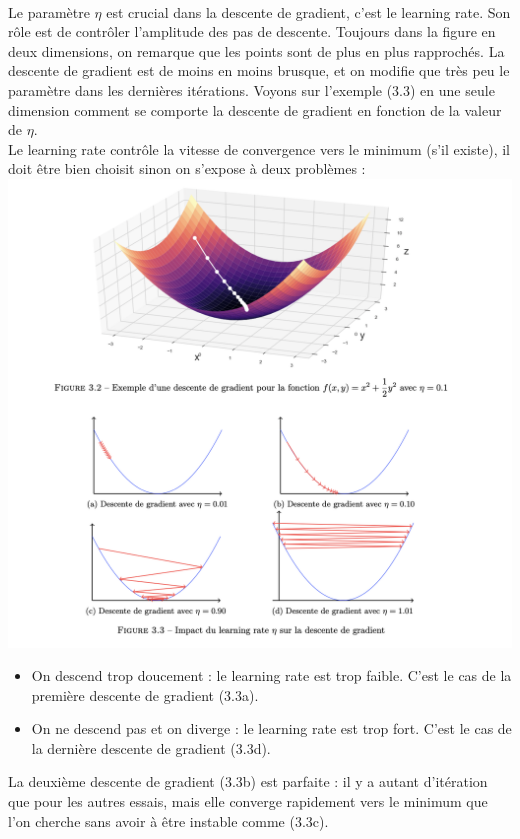 \\
Le paramètre $\eta$ est crucial dans la descente de gradient, c’est le learning rate. Son rôle est de contrôler l’amplitude des pas de descente. Toujours dans la figure en deux dimensions, on remarque que les points sont de plus en plus rapprochés. La descente de gradient est de moins en moins brusque, et on modifie que très peu le paramètre dans les dernières itérations. Voyons sur l’exemple (3.3) en une seule dimension comment se comporte la descente de gradient en fonction de la valeur de $\eta$.
\\
Le learning rate contrôle la vitesse de convergence vers le minimum (s'il existe), il doit être bien choisit sinon on s’expose à deux problèmes :
\\
\includegraphics[width=\linewidth]{./img/notions_math/gradiant_descent/courbe_2}
\begin{itemize}
    \item On descend trop doucement : le learning rate est trop faible. C’est le cas de la première descente de gradient (3.3a).
    \item On ne descend pas et on diverge : le learning rate est trop fort. C’est le cas de la dernière descente de gradient (3.3d).
\end{itemize}
La deuxième descente de gradient (3.3b) est parfaite : il y a autant d’itération que pour les autres essais, mais elle converge rapidement vers le minimum que l’on cherche sans avoir à être instable comme (3.3c).
